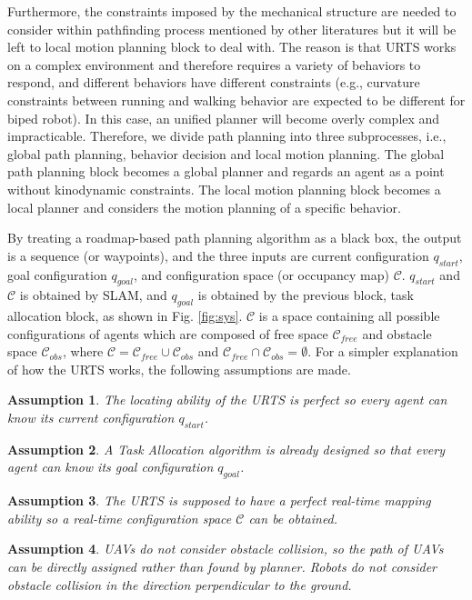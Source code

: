 \documentclass{ieeeaccess}
\newtheorem{assumption}{Assumption}[section]
\begin{document}
Furthermore, the constraints imposed by the mechanical structure are needed to consider within pathfinding process mentioned by other literatures but it will be left to local motion planning block to deal with. The reason is that URTS works on a complex environment and therefore requires a variety of behaviors to respond, and different behaviors have different constraints (e.g., curvature constraints between running and walking behavior are expected to be different for biped robot). In this case, an unified planner will become overly complex and impracticable. Therefore, we divide path planning into three subprocesses, i.e., global path planning, behavior decision and local motion planning. The global path planning block becomes a global planner and regards an agent as a point without kinodynamic constraints. The local motion planning block becomes a local planner and considers the motion planning of a specific behavior.

By treating a roadmap-based path planning algorithm as a black box, the output is a sequence (or waypoints), and the three inputs are current configuration $q_{start}$, goal configuration $q_{goal}$, and configuration space (or occupancy map) $\mathcal{C}$. $q_{start}$ and $\mathcal{C}$ is obtained by SLAM, and $q_{goal}$ is obtained by the previous block, task allocation block, as shown in Fig. \ref{fig:sys}. $\mathcal{C}$ is a space containing all possible configurations of agents which are composed of free space $\mathcal{C}_{free}$ and obstacle space $\mathcal{C}_{obs}$, where $\mathcal{C}=\mathcal{C}_{free}\cup\mathcal{C}_{obs}$ and $\mathcal{C}_{free}\cap\mathcal{C}_{obs}=\emptyset$. For a simpler explanation of how the URTS works, the following assumptions are made.

\begin{assumption}
    The locating ability of the URTS is perfect so every agent can know its current configuration $q_{start}$.
\end{assumption}
\begin{assumption}
    A Task Allocation algorithm is already designed so that every agent can know its goal configuration $q_{goal}$.
\end{assumption}
\begin{assumption}
    The URTS is supposed to have a perfect real-time mapping ability so a real-time configuration space $\mathcal{C}$ can be obtained.
\end{assumption}
\begin{assumption} \label{asm:collision} %
    UAVs do not consider obstacle collision, so the path of UAVs can be directly assigned rather than found by planner. Robots do not consider obstacle collision in the direction perpendicular to the ground. 
\end{assumption}
\end{document}
